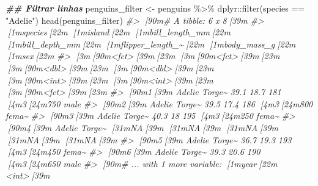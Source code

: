 \documentclass[
]{book}
\newenvironment{Shaded}{\begin{snugshade}}{\end{snugshade}}
\newcommand{\CommentTok}[1]{\textcolor[rgb]{0.37,0.37,0.37}{\textit{#1}}}
\newcommand{\DocumentationTok}[1]{\textcolor[rgb]{0.37,0.37,0.37}{\textbf{\textit{#1}}}}
\newcommand{\FunctionTok}[1]{\textcolor[rgb]{0,0,0}{#1}}
\newcommand{\NormalTok}[1]{#1}
\newcommand{\OtherTok}[1]{\textcolor[rgb]{0.37,0.37,0.37}{#1}}
\newcommand{\SpecialCharTok}[1]{\textcolor[rgb]{0,0,0}{#1}}
\newcommand{\StringTok}[1]{\textcolor[rgb]{0.5,0.5,0.5}{#1}}
\begin{document}
\begin{Shaded}
\begin{Highlighting}[]
\DocumentationTok{\#\# Filtrar linhas}
\NormalTok{penguins\_filter }\OtherTok{\textless{}{-}}\NormalTok{ penguins }\SpecialCharTok{\%\textgreater{}\%} 
\NormalTok{  dplyr}\SpecialCharTok{::}\FunctionTok{filter}\NormalTok{(species }\SpecialCharTok{==} \StringTok{"Adelie"}\NormalTok{)}
\FunctionTok{head}\NormalTok{(penguins\_filter)}
\CommentTok{\#\textgreater{} [90m\# A tibble: 6 x 8[39m}
\CommentTok{\#\textgreater{}   [1mspecies[22m [1misland[22m [1mbill\_length\_mm[22m [1mbill\_depth\_mm[22m [1mflipper\_length\_\textasciitilde{}[22m [1mbody\_mass\_g[22m [1msex[22m  }
\CommentTok{\#\textgreater{}   [3m[90m\textless{}fct\textgreater{}[39m[23m   [3m[90m\textless{}fct\textgreater{}[39m[23m           [3m[90m\textless{}dbl\textgreater{}[39m[23m         [3m[90m\textless{}dbl\textgreater{}[39m[23m            [3m[90m\textless{}int\textgreater{}[39m[23m       [3m[90m\textless{}int\textgreater{}[39m[23m [3m[90m\textless{}fct\textgreater{}[39m[23m}
\CommentTok{\#\textgreater{} [90m1[39m Adelie  Torge\textasciitilde{}           39.1          18.7              181        [4m3[24m750 male }
\CommentTok{\#\textgreater{} [90m2[39m Adelie  Torge\textasciitilde{}           39.5          17.4              186        [4m3[24m800 fema\textasciitilde{}}
\CommentTok{\#\textgreater{} [90m3[39m Adelie  Torge\textasciitilde{}           40.3          18                195        [4m3[24m250 fema\textasciitilde{}}
\CommentTok{\#\textgreater{} [90m4[39m Adelie  Torge\textasciitilde{}           [31mNA[39m            [31mNA[39m                 [31mNA[39m          [31mNA[39m [31mNA[39m   }
\CommentTok{\#\textgreater{} [90m5[39m Adelie  Torge\textasciitilde{}           36.7          19.3              193        [4m3[24m450 fema\textasciitilde{}}
\CommentTok{\#\textgreater{} [90m6[39m Adelie  Torge\textasciitilde{}           39.3          20.6              190        [4m3[24m650 male }
\CommentTok{\#\textgreater{} [90m\# ... with 1 more variable: [1myear[22m \textless{}int\textgreater{}[39m}


\end{Highlighting}
\end{Shaded}
\end{document}

